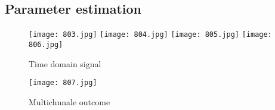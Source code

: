 \subsection{Parameter estimation}\label{Ap4}



\begin{figure}[!htbp]
%
\centering
\texttt{[image: 803.jpg]}
\label{UST1}
\texttt{[image: 804.jpg]}
\label{UST2}
\endminipage\hfill
{}%
\centering
\texttt{[image: 805.jpg]}
\label{UST3}
\texttt{[image: 806.jpg]}
\label{UST4}
\endminipage\hfill
\caption{Time domain signal}
\end{figure}

\begin{figure}[!htbp]
\centering
\texttt{[image: 807.jpg]}
\caption{Multichnnale outcome}\label{UST5}
\end{figure}
